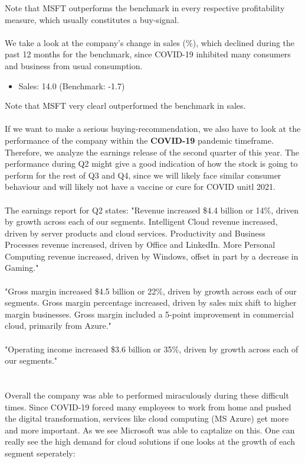 \documentclass[]{article}
\begin{document}
	\noindent Note that MSFT outperforms the benchmark in every respective profitability measure, which usually constitutes a  buy-signal. \\\\
	We take a look at the company's change in sales (\%), which declined during the past 12 months for the benchmark, since COVID-19 inhibited many consumers and business from usual consumption.
	\begin{itemize}
		\item Sales: 14.0 (Benchmark: -1.7)
	\end{itemize}
	Note that MSFT very clearl outperformed the benchmark in sales.\\\\
	\noindent If we want to make a serious buying-recommendation, we also have to look at the performance of the company within the \textbf{COVID-19} pandemic timeframe. Therefore, we analyze the earnings release of the second quarter of this year. The performance during Q2 might give a good indication of how the stock is going to perform for the rest of Q3 and Q4, since we will likely face similar consumer behaviour and will likely not have a vaccine or cure for COVID unitl 2021.\\\\
	The earnings report for Q2 states: "Revenue increased \$4.4 billion or 14\%, driven by growth across each of our segments. Intelligent Cloud revenue increased, driven by server products and cloud services. Productivity and Business Processes revenue increased, driven by Office and LinkedIn. More Personal Computing revenue increased, driven by Windows, offset in part by a decrease in Gaming."\cite{microsoft}\\\\
	"Gross margin increased \$4.5 billion or 22\%, driven by growth across each of our segments. Gross margin percentage increased, driven by sales mix shift to higher margin businesses. Gross margin included a 5-point improvement in commercial cloud, primarily from Azure."\cite{microsoft}\\\\
	"Operating income increased \$3.6 billion or 35\%, driven by growth across each of our segments."\\ \cite{microsoft}\\\\
	Overall the company was able to performed miraculously during these difficult times. Since COVID-19 forced many employees to work from home and pushed the digital transformation, services like cloud computing (MS Azure) get more and more important. As we see Microsoft was able to captalize on this. One can really see the high demand for cloud solutions if one looks at the growth of each segment seperately:\cite{microsoft}
	
\end{document}
